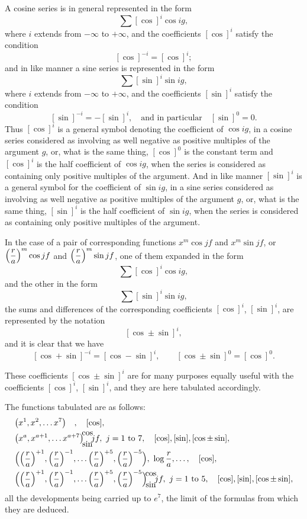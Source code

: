 \documentclass[12pt,a4paper]{article}
\theoremstyle{plain}
\begin{document}
\medskip
A cosine series is in general represented in the form
\[
\sum[\cos]^{i}\cos ig,
\]
where $i$ extends from $-\infty$ to $+\infty$, and the coefficients $[\cos]^{i}$ satisfy the condition
\[
[\cos]^{-i}=[\cos]^{i};
\]
and in like manner a sine series is represented in the form
\[
\sum[\sin]^{i}\sin ig,
\]
where $i$ extends from $-\infty$ to $+\infty$, and the coefficients $[\sin]^{i}$ satisfy the condition
\[
[\sin]^{-i}=-[\sin]^{i},\quad \text{and in particular}\quad [\sin]^{0}=0.
\]
Thus $[\cos]^{i}$ is a general symbol denoting the coefficient of $\cos ig$, in a cosine series considered as involving as well negative as positive multiples of the argument $g$, or, what is the same thing, $[\cos]^{0}$ is the constant term and $[\cos]^{i}$ is the half coefficient of $\cos ig$, when the series is considered as containing only positive multiples of the argument. And in like manner $[\sin]^{i}$ is a general symbol for the coefficient of $\sin ig$, in a sine series considered as involving as well negative as positive multiples of the argument $g$, or, what is the same thing, $[\sin]^{i}$ is the half coefficient of $\sin ig$, when the series is considered as containing only positive multiples of the argument.

\newpage
{} In the case of a pair of corresponding functions $x^{m}\cos jf$ and $x^{m}\sin jf$, or $\Bigl(\dfrac{r}{a}\Bigr)^{m}\cos jf$ and $\Bigl(\dfrac{r}{a}\Bigr)^{m}\sin jf$, one of them expanded in the form
\[
\sum[\cos]^{i}\cos ig,
\]
and the other in the form
\[
\sum[\sin]^{i}\sin ig,
\]
the sums and differences of the corresponding coefficients $[\cos]^{i}$, $[\sin]^{i}$, are represented by the notation
\[
[\cos\pm\sin]^{i},
\]
and it is clear that we have
\[
[\cos+\sin]^{-i}=[\cos-\sin]^{i},\qquad [\cos\pm\sin]^{0}=[\cos]^{0}.
\]

\medskip
These coefficients $[\cos\pm\sin]^{i}$ are for many purposes equally useful with the coefficients $[\cos]^{i}$, $[\sin]^{i}$, and they are here tabulated accordingly.

\medskip
The functions tabulated are as follows:
\begin{align*}
&\bigl(x^{1},x^{2},\ldots x^{7}\bigr)\quad ,\quad [\cos],\\
&\bigl(x^{a},x^{a+1},\ldots x^{a+7}\bigr)\!\!{\cos\atop\sin}\!\!jf,\ j=1\text{ to }7,\quad [\cos],[\sin],[\cos\pm\sin],\\
&\Bigl(\Bigl(\dfrac{r}{a}\Bigr)^{+1},\Bigl(\dfrac{r}{a}\Bigr)^{-1},\ldots\Bigl(\dfrac{r}{a}\Bigr)^{+5},\Bigl(\dfrac{r}{a}\Bigr)^{-5}\Bigr),\ \log\dfrac{r}{a},\ldots,\quad [\cos],\\
&\Bigl(\Bigl(\dfrac{r}{a}\Bigr)^{+1},\Bigl(\dfrac{r}{a}\Bigr)^{-1},\ldots\Bigl(\dfrac{r}{a}\Bigr)^{+5},\Bigl(\dfrac{r}{a}\Bigr)^{-5}\Bigr)\!\!{\cos\atop\sin}\!\!jf,\ j=1\text{ to }5,\quad [\cos],[\sin],[\cos\pm\sin],
\end{align*}
all the developments being carried up to $e^{7}$, the limit of the formulas from which they are deduced.
\end{document}
